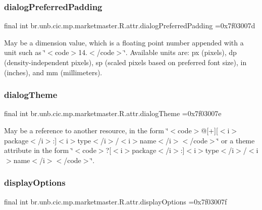 \subsubsection{\texorpdfstring{dialog\+Preferred\+Padding}{dialogPreferredPadding}}
{\footnotesize\ttfamily final int br.\+unb.\+cic.\+mp.\+marketmaster.\+R.\+attr.\+dialog\+Preferred\+Padding =0x7f03007d\hspace{0.3cm}{\ttfamily [static]}}

May be a dimension value, which is a floating point number appended with a unit such as \char`\"{}$<$code$>$14.\+5sp$<$/code$>$\char`\"{}. Available units are\+: px (pixels), dp (density-\/independent pixels), sp (scaled pixels based on preferred font size), in (inches), and mm (millimeters). \mbox{\label{classbr_1_1unb_1_1cic_1_1mp_1_1marketmaster_1_1R_1_1attr_ae7da9ba682e3d8954272f76ae5283c0a}} 
\subsubsection{\texorpdfstring{dialog\+Theme}{dialogTheme}}
{\footnotesize\ttfamily final int br.\+unb.\+cic.\+mp.\+marketmaster.\+R.\+attr.\+dialog\+Theme =0x7f03007e\hspace{0.3cm}{\ttfamily [static]}}

May be a reference to another resource, in the form \char`\"{}$<$code$>$@\mbox{[}+\mbox{]}\mbox{[}$<$i$>$package$<$/i$>$\+:\mbox{]}$<$i$>$type$<$/i$>$/$<$i$>$name$<$/i$>$$<$/code$>$\char`\"{} or a theme attribute in the form \char`\"{}$<$code$>$?\mbox{[}$<$i$>$package$<$/i$>$\+:\mbox{]}$<$i$>$type$<$/i$>$/$<$i$>$name$<$/i$>$$<$/code$>$\char`\"{}. \mbox{\label{classbr_1_1unb_1_1cic_1_1mp_1_1marketmaster_1_1R_1_1attr_a04f7253d411888bc53529fee99e2efcb}} 
\subsubsection{\texorpdfstring{display\+Options}{displayOptions}}
{\footnotesize\ttfamily final int br.\+unb.\+cic.\+mp.\+marketmaster.\+R.\+attr.\+display\+Options =0x7f03007f\hspace{0.3cm}{\ttfamily [static]}}


